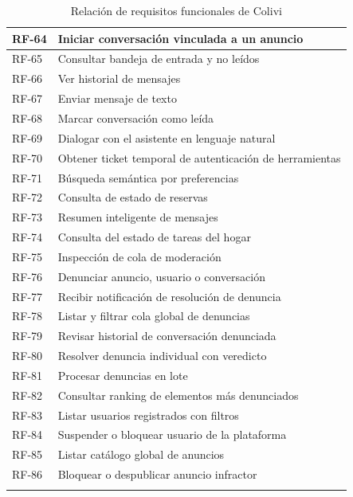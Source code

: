 \begin{longtable}{|p{2cm}|p{12cm}|}
    RF-64 & Iniciar conversación vinculada a un anuncio \\ \hline
    RF-65 & Consultar bandeja de entrada y no leídos \\ \hline
    RF-66 & Ver historial de mensajes \\ \hline
    RF-67 & Enviar mensaje de texto \\ \hline
    RF-68 & Marcar conversación como leída \\ \hline

    RF-69 & Dialogar con el asistente en lenguaje natural \\ \hline
    RF-70 & Obtener ticket temporal de autenticación de herramientas \\ \hline
    RF-71 & Búsqueda semántica por preferencias \\ \hline
    RF-72 & Consulta de estado de reservas \\ \hline
    RF-73 & Resumen inteligente de mensajes \\ \hline
    RF-74 & Consulta del estado de tareas del hogar \\ \hline
    RF-75 & Inspección de cola de moderación \\ \hline

    RF-76 & Denunciar anuncio, usuario o conversación \\ \hline
    RF-77 & Recibir notificación de resolución de denuncia \\ \hline
    RF-78 & Listar y filtrar cola global de denuncias \\ \hline
    RF-79 & Revisar historial de conversación denunciada \\ \hline
    RF-80 & Resolver denuncia individual con veredicto \\ \hline
    RF-81 & Procesar denuncias en lote \\ \hline
    RF-82 & Consultar ranking de elementos más denunciados \\ \hline
    RF-83 & Listar usuarios registrados con filtros \\ \hline
    RF-84 & Suspender o bloquear usuario de la plataforma \\ \hline
    RF-85 & Listar catálogo global de anuncios \\ \hline
    RF-86 & Bloquear o despublicar anuncio infractor \\ \hline

    \caption{Relación de requisitos funcionales de Colivi}
\end{longtable}

